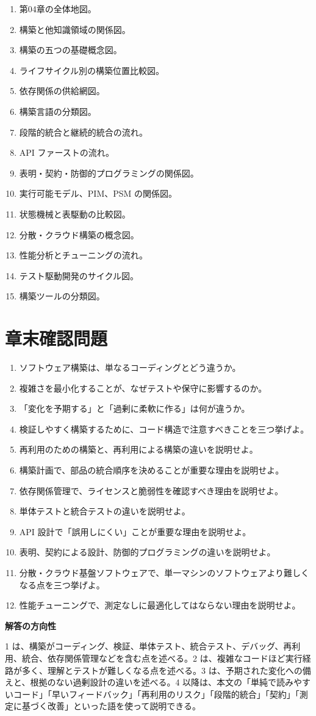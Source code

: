 \documentclass[a4paper,11pt,ja=standard,xelatex]{bxjsarticle}
\begin{document}
\begin{enumerate}
  \item 第04章の全体地図。
  \item 構築と他知識領域の関係図。
  \item 構築の五つの基礎概念図。
  \item ライフサイクル別の構築位置比較図。
  \item 依存関係の供給網図。
  \item 構築言語の分類図。
  \item 段階的統合と継続的統合の流れ。
  \item API ファーストの流れ。
  \item 表明・契約・防御的プログラミングの関係図。
  \item 実行可能モデル、PIM、PSM の関係図。
  \item 状態機械と表駆動の比較図。
  \item 分散・クラウド構築の概念図。
  \item 性能分析とチューニングの流れ。
  \item テスト駆動開発のサイクル図。
  \item 構築ツールの分類図。
\end{enumerate}

\section{章末確認問題}

\begin{enumerate}
  \item ソフトウェア構築は、単なるコーディングとどう違うか。
  \item 複雑さを最小化することが、なぜテストや保守に影響するのか。
  \item 「変化を予期する」と「過剰に柔軟に作る」は何が違うか。
  \item 検証しやすく構築するために、コード構造で注意すべきことを三つ挙げよ。
  \item 再利用のための構築と、再利用による構築の違いを説明せよ。
  \item 構築計画で、部品の統合順序を決めることが重要な理由を説明せよ。
  \item 依存関係管理で、ライセンスと脆弱性を確認すべき理由を説明せよ。
  \item 単体テストと統合テストの違いを説明せよ。
  \item API 設計で「誤用しにくい」ことが重要な理由を説明せよ。
  \item 表明、契約による設計、防御的プログラミングの違いを説明せよ。
  \item 分散・クラウド基盤ソフトウェアで、単一マシンのソフトウェアより難しくなる点を三つ挙げよ。
  \item 性能チューニングで、測定なしに最適化してはならない理由を説明せよ。
\end{enumerate}

\begin{plainbox}
\textbf{解答の方向性}

1 は、構築がコーディング、検証、単体テスト、統合テスト、デバッグ、再利用、統合、依存関係管理などを含む点を述べる。2 は、複雑なコードほど実行経路が多く、理解とテストが難しくなる点を述べる。3 は、予期された変化への備えと、根拠のない過剰設計の違いを述べる。4 以降は、本文の「単純で読みやすいコード」「早いフィードバック」「再利用のリスク」「段階的統合」「契約」「測定に基づく改善」といった語を使って説明できる。
\end{plainbox}
\end{document}
